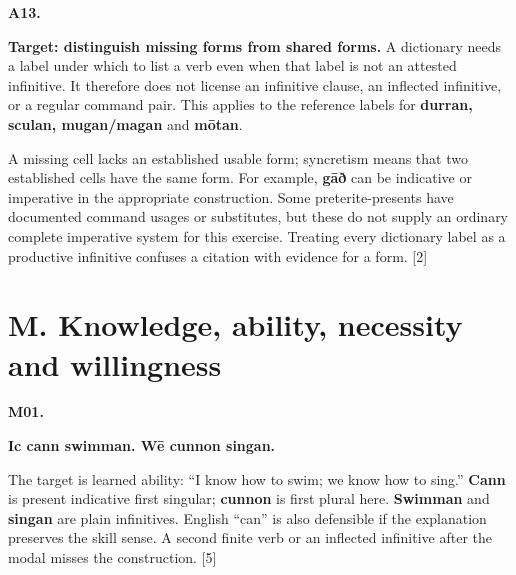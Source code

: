 \par\begin{minipage}{\linewidth}\raggedright
\textbf{A13.}

\textbf{Target: distinguish missing forms from shared forms.} A dictionary needs a label under which to list a verb even when that label is not an attested infinitive. It therefore does not license an infinitive clause, an inflected infinitive, or a regular command pair. This applies to the reference labels for \textbf{durran, sculan, mugan/\allowbreak{}magan} and \textbf{mōtan}.

A missing cell lacks an established usable form; syncretism means that two established cells have the same form. For example, \textbf{gāð} can be indicative or imperative in the appropriate construction. Some preterite-presents have documented command usages or substitutes, but these do not supply an ordinary complete imperative system for this exercise. Treating every dictionary label as a productive infinitive confuses a citation with evidence for a form. [2]

\end{minipage}\par\addvspace{4pt}

\section*{M. Knowledge, ability, necessity and willingness}

\par\begin{minipage}{\linewidth}\raggedright
\textbf{M01.}

\textbf{Ic cann swimman. Wē cunnon singan.}

The target is learned ability: “I know how to swim; we know how to sing.” \textbf{Cann} is present indicative first singular; \textbf{cunnon} is first plural here. \textbf{Swimman} and \textbf{singan} are plain infinitives. English “can” is also defensible if the explanation preserves the skill sense. A second finite verb or an inflected infinitive after the modal misses the construction. [5]

\end{minipage}\par\addvspace{4pt}

